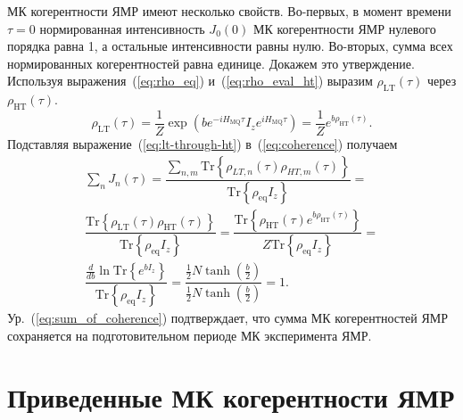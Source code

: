 МК когерентности ЯМР имеют несколько свойств.
Во-первых, в момент времени  $\tau=0$
нормированная интенсивность $J_0(0)$ МК когерентности ЯМР нулевого порядка равна 1,
а остальные интенсивности равны нулю.
Во-вторых, сумма всех нормированных когерентностей равна единице.
Докажем это утверждение.
Используя выражения~(\ref{eq:rho_eq}) и~(\ref{eq:rho_eval_ht})
выразим $\rho_\mathrm{LT}(\tau)$ через $\rho_\mathrm{HT}(\tau)$.
%
\begin{equation}\label{eq:lt-through-ht}
  \rho_\mathrm{LT}(\tau) = \dfrac 1 Z
  \exp\left(be^{-iH_\mathrm{MQ}\tau} I_z e^{iH_\mathrm{MQ}\tau}\right) =
  \dfrac 1 Z e^{b\rho_\mathrm{HT}(\tau)}.
\end{equation}
%
Подставляя выражение~(\ref{eq:lt-through-ht}) в~(\ref{eq:coherence}) получаем
%
\begin{multline}
  \label{eq:sum_of_coherence}
  \sum\limits_n J_n(\tau) =
  \dfrac{\sum\limits_{n, m}\mathrm{Tr}\left\{
      \rho_{LT, n}(\tau)\rho_{HT, m}(\tau)
  \right\}}
  {\mathrm{Tr}\left\{\rho_\mathrm{eq} I_z\right\}} = \\
  \dfrac{\mathrm{Tr}\left\{
      \rho_\mathrm{LT}(\tau)\rho_\mathrm{HT}(\tau)
  \right\}}
  {\mathrm{Tr}\left\{\rho_\mathrm{eq} I_z\right\}} =
  \dfrac{\mathrm{Tr}\left\{
      \rho_\mathrm{HT}(\tau)e^{b\rho_\mathrm{HT}(\tau)}
  \right\}}
  {Z\mathrm{Tr}\left\{\rho_\mathrm{eq} I_z\right\}} = \\
  \dfrac{\frac{d}{db} \ln \mathrm{Tr}\left\{
      e^{b I_z}
  \right\}}
  {\mathrm{Tr}\left\{\rho_\mathrm{eq} I_z\right\}} =
  \dfrac{\frac 1 2 N \tanh \left( \frac b 2 \right)}
  {\frac 1 2 N \tanh \left( \frac b 2 \right)} = 1.
\end{multline}
Ур.~(\ref{eq:sum_of_coherence}) подтверждает,
что сумма МК когерентностей ЯМР сохраняется на подготовительном периоде МК эксперимента ЯМР.


\section{Приведенные МК когерентности ЯМР}
\label{sec:reduced-mq-coherences}

